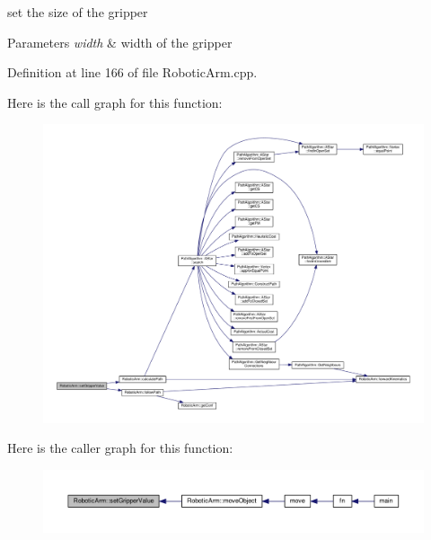 set the size of the gripper 


\begin{DoxyParams}{Parameters}
{\em width} & width of the gripper \\
\hline
\end{DoxyParams}


Definition at line 166 of file Robotic\+Arm.\+cpp.



Here is the call graph for this function\+:\nopagebreak
\begin{figure}[H]
\begin{center}
\leavevmode
\includegraphics[width=350pt]{class_robotic_arm_a5b15b0eb40028d3524bae3a52552bd85_cgraph}
\end{center}
\end{figure}




Here is the caller graph for this function\+:\nopagebreak
\begin{figure}[H]
\begin{center}
\leavevmode
\includegraphics[width=350pt]{class_robotic_arm_a5b15b0eb40028d3524bae3a52552bd85_icgraph}
\end{center}
\end{figure}


